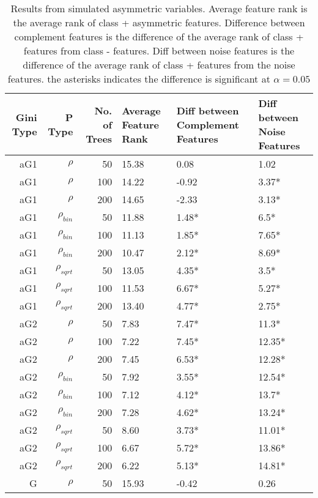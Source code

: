 \documentclass[twoside,11pt]{article}
\begin{document}
\begin{table}%
  \centering
  \caption{Results from simulated asymmetric variables. Average feature rank is the average rank of class + asymmetric features. Difference between complement features is the difference of the average rank of class + features from class - features. Diff between noise features is the difference of the average rank of class + features from the noise features. the asterisks indicates the difference is significant at $\alpha=0.05$ }
\begin{tabular}{rrrp{2.5cm}p{2.5cm}p{2.5cm}}
\hline
Gini Type & P Type & No. of Trees & Average Feature Rank & Diff between Complement Features & Diff between Noise Features \bigstrut\\
\hline
\renewcommand{\arraystretch}{.5}
aG1   & $\rho$ & 50    & 15.38 & 0.08  & 1.02 \bigstrut[t]\\
aG1   & $\rho$ & 100   & 14.22 & -0.92 & 3.37* \\
aG1   & $\rho$ & 200   & 14.65 & -2.33 & 3.13* \\
aG1   & $\rho_{bin}$ & 50    & 11.88 & 1.48* & 6.5* \\
aG1   & $\rho_{bin}$ & 100   & 11.13 & 1.85* & 7.65* \\
aG1   & $\rho_{bin}$ & 200   & 10.47 & 2.12* & 8.69* \\
aG1   & $\rho_{sqrt}$ & 50    & 13.05 & 4.35* & 3.5* \\
aG1   & $\rho_{sqrt}$ & 100   & 11.53 & 6.67* & 5.27* \\
aG1   & $\rho_{sqrt}$ & 200   & 13.40 & 4.77* & 2.75* \\
aG2   & $\rho$ & 50    & 7.83  & 7.47* & 11.3* \\
aG2   & $\rho$ & 100   & 7.22  & 7.45* & 12.35* \\
aG2   & $\rho$ & 200   & 7.45  & 6.53* & 12.28* \\
aG2   & $\rho_{bin}$ & 50    & 7.92  & 3.55* & 12.54* \\
aG2   & $\rho_{bin}$ & 100   & 7.12  & 4.12* & 13.7* \\
aG2   & $\rho_{bin}$ & 200   & 7.28  & 4.62* & 13.24* \\
aG2   & $\rho_{sqrt}$ & 50    & 8.60  & 3.73* & 11.01* \\
aG2   & $\rho_{sqrt}$ & 100   & 6.67  & 5.72* & 13.86* \\
aG2   & $\rho_{sqrt}$ & 200   & 6.22  & 5.13* & 14.81* \\
G     & $\rho$ & 50    & 15.93 & -0.42 & 0.26 \\

\end{tabular}
\end{table}
\end{document}
